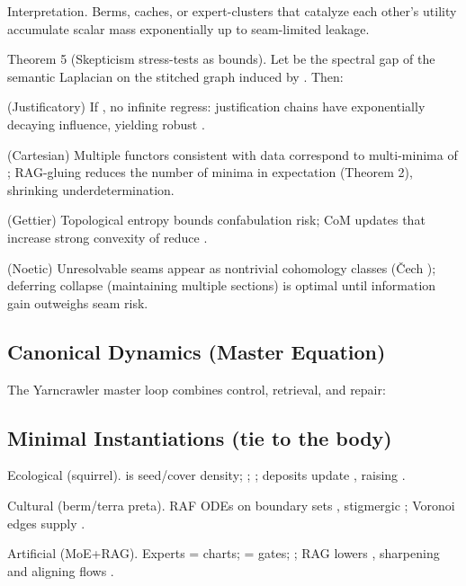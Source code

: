 \documentclass{article}
\begin{document}
Interpretation. Berms, caches, or expert-clusters that catalyze each other’s utility accumulate scalar mass exponentially up to seam-limited leakage.

Theorem 5 (Skepticism stress-tests as bounds).
Let  be the spectral gap of the semantic Laplacian on the stitched graph induced by . Then:

(Justificatory) If , no infinite regress: justification chains have exponentially decaying influence, yielding robust .

(Cartesian) Multiple functors consistent with data correspond to multi-minima of ; RAG-gluing reduces the number of minima in expectation (Theorem 2), shrinking underdetermination.

(Gettier) Topological entropy  bounds confabulation risk; CoM updates that increase strong convexity of  reduce .

(Noetic) Unresolvable seams appear as nontrivial cohomology classes (Čech ); deferring collapse (maintaining multiple sections) is optimal until information gain outweighs seam risk.

\subsection{Canonical Dynamics (Master Equation)}

The Yarncrawler master loop combines control, retrieval, and repair:


\subsection{Minimal Instantiations (tie to the body)}

Ecological (squirrel).  is seed/cover density; ; ; deposits update , raising .

Cultural (berm/terra preta). RAF ODEs on boundary sets , stigmergic ; Voronoi edges supply .

Artificial (MoE+RAG). Experts = charts;  = gates; ; RAG lowers , sharpening  and aligning flows .

\newpage


\end{document}
